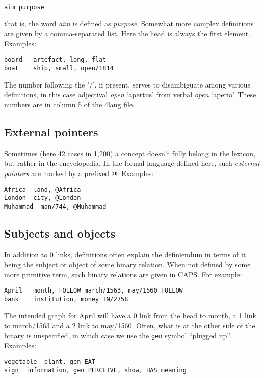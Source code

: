 \documentclass[11pt,bookmarks,bookmarksnumbered,naturalnames,plainpages=false,pdftex,colorlinks=true,urlcolor=blue,bookmarksdepth=subsection,plainpages=false]{paper}
\begin{document}
\noindent
{\tt aim   purpose}

\noindent
that is, the word {\it aim} is defined as {\it purpose}. Somewhat more complex
definitions are given by a comma-separated list. Here the head is always the
first element. Examples:

\begin{verbatim}
board   artefact, long, flat    
boat    ship, small, open/1814  
\end{verbatim}

The number following the '/', if present, serves to disambiguate among various
definitions, in this case adjectival {\it open} `apertus' from verbal
{\it open} `aperio'. These numbers are in column 5 of the 4lang file. 

\subsection{External pointers}\label{atsign}

Sometimes (here 42 cases in 1,200) a concept doesn't fully belong in the
lexicon, but rather in the encyclopedia. In the formal language defined here,
such {\it external pointers} are marked by a prefixed @. Examples:

\begin{verbatim}
Africa	land, @Africa	
London	city, @London	
Muhammad  man/744, @Muhammad	
\end{verbatim}

\subsection{Subjects and objects}\label{subjobj}

In addition to 0 links, definitions often explain the definiendum in terms of
it being the subject or object of some binary relation. When not defined by
some more primitive term, such binary relations are given in CAPS.  For
example:

\begin{verbatim}
April   month, FOLLOW march/1563, may/1560 FOLLOW
bank    institution, money IN/2758
\end{verbatim}

\noindent
The intended graph for April will have a 0 link from the head to month, a 1
link to march/1563 and a 2 link to may/1560. Often, what is at the other side
of the binary is unspecified, in which case we use the {\tt gen} symbol ``plugged
up''.  Examples:

\begin{verbatim}
vegetable  plant, gen EAT
sign  information, gen PERCEIVE, show, HAS meaning
\end{verbatim}
\end{document}
